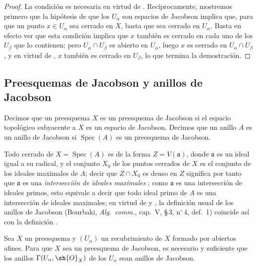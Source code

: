 \begin{proof}
La condición es necesaria en virtud de .
Recíprocamente, mostremos primero que la hipótesis de que los $U_\alpha$ son espacios de Jacobson implica que, para que un punto $x\in U_\alpha$ sea cerrado en $X$, basta que sea cerrado en $U_\alpha$.
Basta en efecto ver que esta condición implica que $x$ también es cerrado en cada uno de los $U_\beta$ que lo contienen; pero $U_\alpha\cap U_\beta$ es abierto en $U_\alpha$, luego $x$ es cerrado en $U_\alpha\cap U_\beta$, y en virtud de , $x$ también es cerrado en $U_\beta$, lo que termina la demostración.
\end{proof}

\subsection{Preesquemas de Jacobson y anillos de Jacobson}
\label{subsection:IV.10.4}

\begin{definition}[10.4.1]
\label{IV.10.4.1}
Decimos que un preesquema $X$ es un preesquema de Jacobson si el espacio topológico subyacente a $X$ es un espacio de Jacobson.
Decimos que un anillo $A$ es un anillo de Jacobson si $\operatorname{Spec}(A)$ es un preesquema de Jacobson.
\end{definition}

Todo cerrado de $X=\operatorname{Spec}(A)$ es de la forma $Z=V(\mathfrak{a})$, donde $\mathfrak{a}$ es un ideal igual a su radical, y el conjunto $X_0$ de los puntos cerrados de $X$ es el conjunto de los ideales maximales de $A$; decir que $Z\cap X_0$ es denso en $Z$ significa por tanto que $\mathfrak{a}$ es una \emph{intersección de ideales maximales} ; como $\mathfrak{a}$ es una intersección de ideales primos, esto equivale a decir que todo ideal primo de $A$ es una intersección de ideales maximales; en virtud de  y , la definición usual de los anillos de Jacobson (Bourbaki, \emph{Alg.\ comm.}, cap.~V, \S\,3, n$^\circ$\,4, def.~1) coincide así con la definición .

\begin{proposition}[10.4.2]
\label{IV.10.4.2}
Sea $X$ un preesquema y $(U_\alpha)$ un recubrimiento de $X$ formado por abiertos afines.
Para que $X$ sea un preesquema de Jacobson, es necesario y suficiente que los anillos $\Gamma(U_\alpha,\sh{O}_X)$ de los $U_\alpha$ sean anillos de Jacobson.
\end{proposition}

